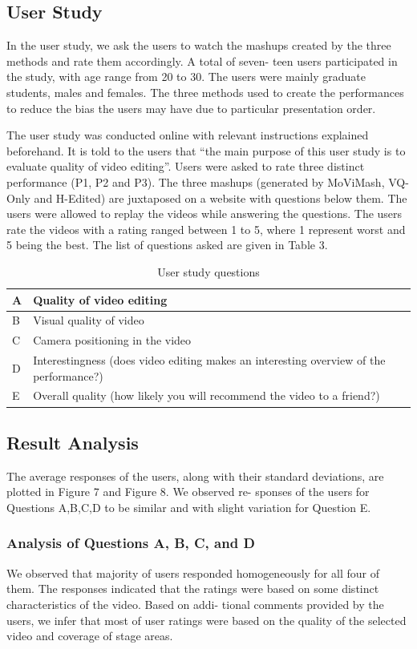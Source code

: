 \documentclass{sig-alternate}
\begin{document}
\subsection{User Study}
In the user study, we ask the users to watch the mashups created
by the three methods and rate them accordingly. A total of seven-
teen users participated in the study, with age range from 20 to 30.
The users were mainly graduate students, males and females. The
three methods used to create the performances to reduce the
bias the users may have due to particular presentation order.

The user study was conducted online with relevant instructions
explained beforehand. It is told to the users that “the main purpose
of this user study is to evaluate quality of video editing”. Users
were asked to rate three distinct performance (P1, P2 and P3). The
three mashups (generated by MoViMash, VQ-Only and H-Edited)
are juxtaposed on a website with questions below them. The users were allowed to replay the videos while answering the questions.
The users rate the videos with a rating ranged between 1 to 5, where
1 represent worst and 5 being the best. The list of questions asked
are given in Table 3.
\begin{table}
\centering
\sevenpt
\caption{User study questions}
\begin{tabular}{p{1cm}|p{7cm}}
A&Quality of video editing\\ \hline
B&Visual quality of video\\ \hline
C&Camera positioning in the video\\ \hline
D&Interestingness (does video editing makes an interesting
overview of the performance?)\\ \hline
E&Overall quality (how likely you will recommend the video to
a friend?)\\\hline
\end{tabular}
\end{table}

 \subsection{Result Analysis}
The average responses of the users, along with their standard
deviations, are plotted in Figure 7 and Figure 8. We observed re-
sponses of the users for Questions A,B,C,D to be similar and with
slight variation for Question E.

\subsubsection{Analysis of Questions A, B, C, and D}
We observed that majority of users responded homogeneously
for all four of them. The responses indicated that the ratings were
based on some distinct characteristics of the video. Based on addi-
tional comments provided by the users, we infer that most of user
ratings were based on the quality of the selected video and coverage
of stage areas.
\end{document}
